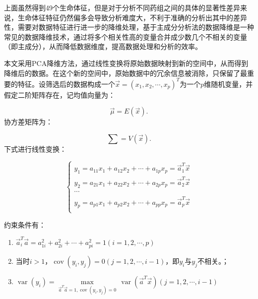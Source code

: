 上面虽然得到49个生命体征，但是对于分析不同药组之间的具体的显著性差异来说，生命体征特征仍然偏多会导致分析难度大，不利于准确的分析出其中的差异性，需要对数据特征进行进一步的降维处理，基于主成分分析法的数据降维是一种常见的数据降维技术，通过将多个相关性高的变量合并成少数几个不相关的变量（即主成分），从而降低数据维度，提高数据处理和分析的效率。

本文采用PCA降维方法，通过线性变换将原始数据映射到新的空间中，从而得到降维后的数据。在这个新的空间中，原始数据中的冗余信息被消除，只保留了最重要的特征。设筛选后的数据构成一个$\overrightarrow{x}={{\left( {{x}_{1}},{{x}_{2}},\cdots ,{{x}_{p}} \right)}^{T}}$为一个$p$维随机变量，并假定二阶矩阵存在，记均值向量为：

\begin{equation}
    \overrightarrow{\mu }=E\left( \overrightarrow{x} \right).
\end{equation}
协方差矩阵为：

\begin{equation}
    \sum =V\left( \overrightarrow{x} \right).
\end{equation}
下式进行线性变换：

\begin{equation}
    \left\{ \begin{matrix}
       {{y}_{1}}={{a}_{11}}{{x}_{1}}+{{a}_{12}}{{x}_{2}}+\cdots +{{a}_{1p}}{{x}_{p}}=\overrightarrow{a}_{1}^{T}\overrightarrow{x}  \\
       {{y}_{2}}={{a}_{21}}{{x}_{1}}+{{a}_{22}}{{x}_{2}}+\cdots +{{a}_{2p}}{{x}_{p}}=\overrightarrow{a}_{2}^{T}\overrightarrow{x}  \\
       \cdots   \\
       {{y}_{p}}={{a}_{p1}}{{x}_{1}}+{{a}_{p2}}{{x}_{2}}+\cdots +{{a}_{pp}}{{x}_{p}}=\overrightarrow{a}_{p}^{T}\overrightarrow{x}  \\
    \end{matrix}\right.
\end{equation}

约束条件有：

\begin{enumerate}
  \item $\overrightarrow{a}_{i}^{T}\overrightarrow{a}=a_{1i}^{2}+a_{2i}^{2}+\cdots +a_{pi}^{2}=1\left( i=1,2,\cdots ,p \right)$
  \item 当时$i>1$，$\operatorname{cov}\left( {{y}_{i}},{{y}_{j}} \right)=0\left( j=1,2,\cdots ,i-1 \right)$，即${{y}_{i}}$与${{y}_{j}}$不相关。；
  \item $\operatorname{var}\left( {{y}_{i}} \right)=\underset{{{\overrightarrow{a}}^{T}}\overrightarrow{a}=1,\operatorname{cov}\left( {{y}_{i}},{{y}_{j}} \right)=0}{\mathop{\max }}\,\operatorname{var}\left( {{\overrightarrow{a}}^{T}}\overrightarrow{x} \right)\left( j=1,2,\cdots ,i-1 \right)$
\end{enumerate}

